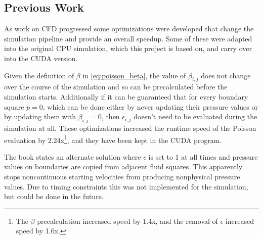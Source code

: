 \subsection{Previous Work}
\label{research:prev_work}
As work on CFD progressed some optimizations were developed that change the simulation pipeline and provide an overall speedup.
Some of these were adapted into the original CPU simulation\cite{modules:aca257submission}, which this project is based on, and carry over into the CUDA version.


Given the definition of $\beta$ in \cref{eq:poisson_beta}, the value of $\beta_{i,j}$ does not change over the course of the simulation and so can be precalculated before the simulation starts.
Additionally if it can be guaranteed that for every boundary square $p = 0$, which can be done either by never updating their pressure values or by updating them with $\beta_{i,j} = 0$, then $\epsilon_{i,j}$ doesn't need to be evaluated during the simulation at all.
These optimizations increased the runtime speed of the Poisson evaluation by 2.24x\footnote{The $\beta$ precalculation increased speed by 1.4x, and the removal of $\epsilon$ increased speed by 1.6x.\cite{modules:aca257submission}}, and they have been kept in the CUDA program.

The book states an alternate solution where $\epsilon$ is set to 1 at all times and pressure values on boundaries are copied from adjacent fluid squares\cite{book:griebel1998numerical}.
This apparently stops noncontinuous starting velocities from producing nonphysical pressure values.
Due to timing constraints this was not implemented for the simulation, but could be done in the future.
\label{ext:PressureValues}


